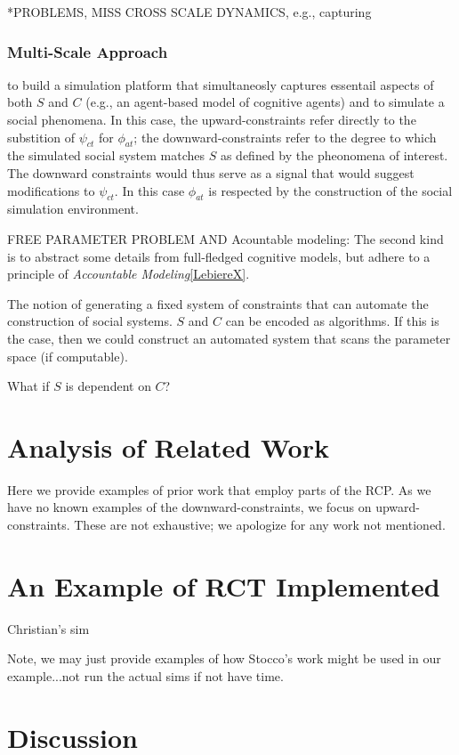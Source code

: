 \documentclass{article}
\begin{document}
*PROBLEMS, MISS CROSS SCALE DYNAMICS, e.g., capturing 

\subsubsection{Multi-Scale Approach}
to build a simulation platform that simultaneosly captures essentail aspects of both $S$ and $C$ (e.g., an agent-based model of cognitive agents) and to simulate a social phenomena.  In this case, the upward-constraints refer directly to the substition of  $\psi_{ct}$ for $\phi_{at}$; the downward-constraints refer to the degree to which the simulated social system matches $S$ as defined by the pheonomena of interest.  The downward constraints would thus serve as a signal that would suggest modifications to $\psi_{ct}$.  In this case $\phi_{at}$ is respected by the construction of the social simulation environment.
 

FREE PARAMETER PROBLEM AND Acountable modeling:  The second kind is to abstract some details from full-fledged cognitive models, but adhere to a principle of \textit{Accountable Modeling}\ref{LebiereX}.

 
The notion of generating a fixed system of constraints that can automate the construction of social systems.  $S$ and $C$ can be encoded as algorithms.  If this is the case, then we could construct an automated system that scans the parameter space (if computable).

What if $S$ is dependent on $C$?


\section{Analysis of Related Work}
Here we provide examples of prior work that employ parts of the RCP.  As we have no known examples of the downward-constraints, we focus on upward-constraints.  These are not exhaustive; we apologize for any work not mentioned.  

\section{An Example of RCT Implemented}
Christian's sim

Note, we may just provide examples of how Stocco's work might be used in our example...not run the actual sims if not have time.

\section{Discussion}
\end{document}
